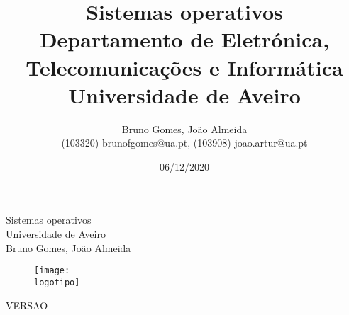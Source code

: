 \documentclass{report}
\begin{document}
%
\def\titulo{Sistemas operativos}
\def\data{06/12/2020}
\def\autores{Bruno Gomes, João Almeida}
\def\autorescontactos{(103320) brunofgomes@ua.pt, (103908) joao.artur@ua.pt}
\def\versao{VERSAO}
\def\departamento{Departamento de Eletrónica, Telecomunicações e Informática}
\def\empresa{Universidade de Aveiro}
\def\logotipo{ua.pdf}
%
%
\renewcommand{\contentsname}{Índice}
\begin{titlepage}

\begin{center}
%
\vspace*{50mm}
%
{\Huge \titulo}\\ 
%
\vspace{10mm}
%
{\Large \empresa}\\
%
\vspace{10mm}
%
{\LARGE \autores}\\ 
%
\vspace{30mm}
%
\begin{figure}[h]
\center
\texttt{[image: \\logotipo]}
\end{figure}
%
\vspace{30mm}
\end{center}
%
\begin{flushright}
\versao
\end{flushright}
\end{titlepage}

\title{%
{\Huge\textbf{\titulo}}\\
{\Large \departamento\\ \empresa}
}
%
\author{%
    \autores \\
    \autorescontactos
}
%
\date{\data}
%
\maketitle

\end{document}
